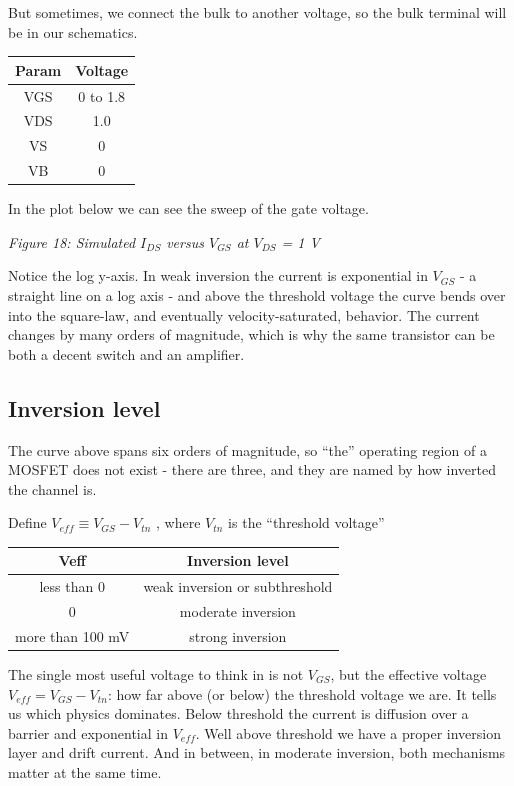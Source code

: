 But sometimes, we connect the bulk to another voltage, so the bulk
terminal will be in our schematics.

\begin{longtable}[]{@{}cc@{}}
\toprule\noalign{}
Param & Voltage \\
\midrule\noalign{}
\endhead
\bottomrule\noalign{}
\endlastfoot
VGS & 0 to 1.8 \\
VDS & 1.0 \\
VS & 0 \\
VB & 0 \\
\end{longtable}

In the plot below we can see the sweep of the gate voltage.


{
\centering
{}
}

\emph{Figure 18: Simulated \(I_{DS}\) versus \(V_{GS}\) at \(V_{DS}\) =
1 V}

Notice the log y-axis. In weak inversion the current is exponential in
\(V_{GS}\) - a straight line on a log axis - and above the threshold
voltage the curve bends over into the square-law, and eventually
velocity-saturated, behavior. The current changes by many orders of
magnitude, which is why the same transistor can be both a decent switch
and an amplifier.

\subsection{Inversion level}\label{inversion-level}

The curve above spans six orders of magnitude, so ``the'' operating
region of a MOSFET does not exist - there are three, and they are named
by how inverted the channel is.

Define \(V_{eff} \equiv V_{GS} - V_{tn}\) , where \(V_{tn}\) is the
``threshold voltage''

\begin{longtable}[]{@{}cc@{}}
\toprule\noalign{}
Veff & Inversion level \\
\midrule\noalign{}
\endhead
\bottomrule\noalign{}
\endlastfoot
less than 0 & weak inversion or subthreshold \\
0 & moderate inversion \\
more than 100 mV & strong inversion \\
\end{longtable}

The single most useful voltage to think in is not \(V_{GS}\), but the
effective voltage \(V_{eff} = V_{GS} - V_{tn}\): how far above (or
below) the threshold voltage we are. It tells us which physics
dominates. Below threshold the current is diffusion over a barrier and
exponential in \(V_{eff}\). Well above threshold we have a proper
inversion layer and drift current. And in between, in moderate
inversion, both mechanisms matter at the same time.

